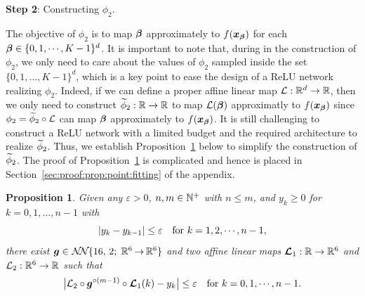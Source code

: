 \documentclass[nohyperref]{article}
\theoremstyle{plain}
\newtheorem{proposition}[theorem]{Proposition}
\theoremstyle{definition}
\theoremstyle{remark}
\begin{document}
\vspace{4pt}
\textbf{Step 2}: Constructing $\phi_2$.


The objective of $\phi_2$ is to map ${\bm{\beta}}$ approximately to $f({\bm{x}}_{\bm{\beta}})$ for each $\bmbeta\in\{0,1,\dotsc,K-1\}^d$.
It is important to note that, during
in the construction of $\phi_2$, we only need to care about the values of $\phi_2$ sampled inside the set $\{0,1,\dotsc,K-1\}^d$, which is a key point to ease the design of a ReLU network realizing $\phi_2$. 
Indeed, if we can define a proper affine linear map $\calL:\R^d\to\R$, then we only need to construct $\tildephi_2:\R\to\R$ to  map ${\mathcal{L}}({\bm{\beta}})$  approximatly to $f({\bm{x}}_{\bm{\beta}})$ since $\phi_2={\widetilde{\phi}}_2\circ {\mathcal{L}}$ can map ${\bm{\beta}}$ approximately to $f({\bm{x}}_{\bm{\beta}})$.
It is still challenging to construct a ReLU network with a limited budget and the required architecture to realize ${\widetilde{\phi}}_2$.
Thus, we establish Proposition~\ref{prop:point:fitting} below to simplify the construction of  ${\widetilde{\phi}}_2$. The proof of Proposition~\ref{prop:point:fitting} is complicated and hence is placed in Section~\ref{sec:proof:prop:point:fitting} of the appendix.


\begin{proposition}
	\label{prop:point:fitting}
	Given any $\varepsilon>0$,\hspace{5pt}  $n,m\in \N^+$ with $n\le m$,
	and  
	${y}_k\ge 0$ for $k=0,1,\dotsc,n-1$  with 
	\[|y_{k}-y_{k-1}|\le \varepsilon\quad \tn{for $k=1,2,\dotsc,n-1,$}\] 
	there exist
	$\bmg\in\nn{16}{2}{6}{6}$ and two affine linear maps $\bmcalL_1:\R\to\R^6$ and $\calL_2:\R^6\to\R$
	such that
	\begin{equation*}
		\big| \calL_2\circ \bmg^{\circ (m-1)}\circ \bmcalL_1(k)-{y}_k\big|\le \eps
		\quad \tn{for $k=0,1,\dotsc,n-1$.}
	\end{equation*}
\end{proposition}
\end{document}
